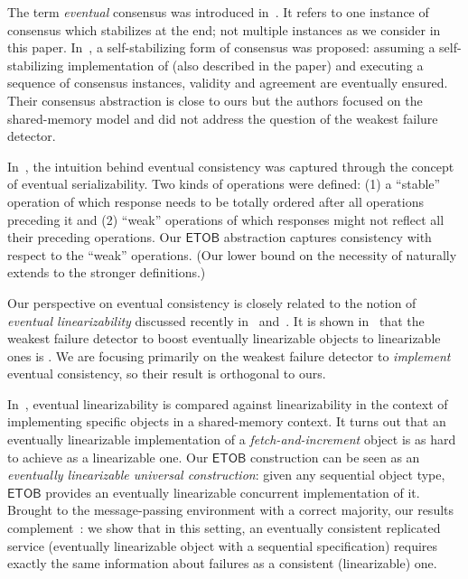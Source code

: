 \documentclass[11pt]{article}
\newcommand{\ETOB}{\ensuremath{\mathsf{ETOB}}}
\begin{document}
The term {\em eventual} consensus was introduced in~\cite{KMO11}. It
refers to one instance of consensus which stabilizes at the end; not multiple instances as we consider in this paper.
In~\cite{Dolev2010}, a self-stabilizing form of consensus was proposed: 
assuming a self-stabilizing implementation of  (also described in the paper) and executing a sequence of consensus instances,   validity and  agreement are eventually ensured. Their consensus abstraction is close to ours but the authors focused on the shared-memory model and did not address the question of the weakest failure detector.

In~\cite{Fekete1996}, the intuition behind eventual consistency was
captured through the concept of eventual serializability. Two kinds of operations
were defined: (1) a
``stable'' operation of which response needs to be totally ordered
after  all operations preceding it and (2) ``weak'' operations of
which responses might not reflect all their preceding operations.
Our {\ETOB} abstraction captures consistency with respect to the
``weak'' operations. (Our lower bound on the necessity of 
 naturally extends to the stronger definitions.)


Our perspective on eventual consistency is closely related to the
notion of \emph{eventual linearizability} discussed recently
in~\cite{Serafini2010} and~\cite{GR14}.
It is shown in~\cite{Serafini2010} that the weakest failure detector
to boost eventually linearizable objects to linearizable ones is
.  We are focusing primarily on the weakest failure
detector to \emph{implement} eventual
consistency,
so their result is orthogonal to ours.




In~\cite{GR14}, eventual linearizability is
compared against linearizability in the context of implementing
specific objects in a shared-memory context.
It turns out that an eventually linearizable implementation of a \textit{fetch-and-increment}
object is as hard to achieve as a linearizable one.
Our {\ETOB} construction can be seen as an \emph{eventually
linearizable universal construction}: given any sequential
object type, {\ETOB} provides an eventually linearizable
concurrent implementation of it.
Brought to the message-passing environment with a correct majority,
our results complement~\cite{GR14}:
we show that in this setting, an eventually consistent replicated
service  (eventually linearizable object with a sequential
specification) requires exactly the same information about failures
as a consistent (linearizable) one.
\end{document}

